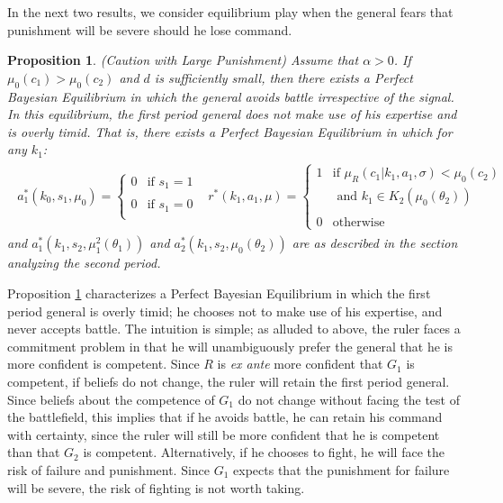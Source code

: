 \documentclass[11pt,]{article}
\newtheorem{proposition}[]{Proposition}
\begin{document}
In the next two results, we consider equilibrium play when the general fears that punishment will be severe should he lose command.
\begin{proposition}(Caution with Large Punishment) Assume that $\alpha>0$.  If $\mu_0(c_1)>\mu_0(c_2)$ and $d$ is sufficiently small, then there exists a Perfect Bayesian Equilibrium in which the general avoids battle irrespective of the signal.  In this equilibrium, the first period general does not make use of his expertise and is overly timid.  That is, there exists a Perfect Bayesian Equilibrium in which for any $k_1$:
\begin{align*}
\begin{array}{cc}
a^*_1(k_0,s_1,\mu_0)=\left\{\begin{array}{ll}
0&\mbox{if }s_1=1\\
&\\
0&\mbox{if }s_1=0\\
\end{array}\right.
&
r^*(k_1,a_1,\mu)=\left\{\begin{array}{ll}
1&\mbox{if }\mu_R(c_1|k_1,a_1,\sigma)<\mu_0(c_2)\\
&\mbox{ and }k_1\in K_2(\mu_0(\theta_2))\\
&\\
0&\mbox{otherwise}
\end{array}\right.
\end{array}
\end{align*}and $a^*_1(k_1,s_2,\mu_1^2(\theta_1))$ and $a^*_2(k_1,s_2,\mu_0(\theta_2))$ are as described in the section analyzing the second period.\label{if d is small then generals can be timid}
\end{proposition}  \noindent Proposition \ref{if d is small then generals can be timid} characterizes a Perfect Bayesian Equilibrium in which the first period general is overly timid; he chooses not to make use of his expertise, and never accepts battle.  The intuition is simple; as alluded to above, the ruler faces a commitment problem in that he will unambiguously prefer the general that he is more confident is competent.  Since $R$ is \textit{ex ante} more confident that $G_1$ is competent, if beliefs do not change, the ruler will retain the first period general.  Since beliefs about the competence of $G_1$ do not change without facing the test of the battlefield, this implies that if he avoids battle, he can retain his command with certainty, since the ruler will still be more confident that he is competent than that $G_2$ is competent.  Alternatively, if he chooses to fight, he will face the risk of failure and punishment.  Since $G_1$ expects that the punishment for failure will be severe, the risk of fighting is not worth taking.
\end{document}
